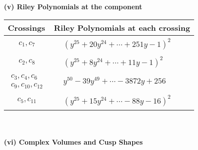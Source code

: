 \documentclass[1p]{elsarticle_modified}
\theoremstyle{definition}
\begin{document}
\flushleft \textbf{(v) Riley Polynomials at the component}\newline \\
\begin{tabular}{m{50pt}|m{274pt}}
Crossings & \hspace{64pt}Riley Polynomials at each crossing \\
\hline $$\begin{aligned}c_{1},c_{7}\end{aligned}$$&$\begin{aligned}
&(y^{25}+20 y^{24}+\cdots+251 y-1)^{2}
\end{aligned}$\\
\hline $$\begin{aligned}c_{2},c_{8}\end{aligned}$$&$\begin{aligned}
&(y^{25}+8 y^{24}+\cdots+11 y-1)^{2}
\end{aligned}$\\
\hline $$\begin{aligned}c_{3},c_{4},c_{6}\\c_{9},c_{10},c_{12}\end{aligned}$$&$\begin{aligned}
&y^{50}-39 y^{49}+\cdots-3872 y+256
\end{aligned}$\\
\hline $$\begin{aligned}c_{5},c_{11}\end{aligned}$$&$\begin{aligned}
&(y^{25}+15 y^{24}+\cdots-88 y-16)^{2}
\end{aligned}$\\
\hline
\end{tabular}\\~\\
\newpage\flushleft \textbf{(vi) Complex Volumes and Cusp Shapes}
\end{document}

